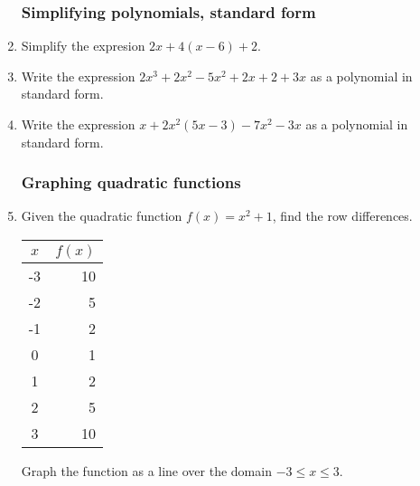 \documentclass[12pt, oneside]{article}
\begin{document}
\begin{enumerate}
\newpage
\subsubsection*{Simplifying polynomials, standard form}

\item Simplify the expresion $2x + 4(x-6)+2$.\vspace{4cm}
\item Write the expression $2x^3+2x^2-5x^2+2x+2+3x$ as a polynomial in standard form. \vspace{7cm}

  \item Write the expression $x+2x^2(5x-3)-7x^2-3x$ as a polynomial in standard form.

\newpage


\subsubsection*{Graphing quadratic functions}

\item Given the quadratic function $f(x)=x^2+1$, find the row differences.
  \renewcommand{\arraystretch}{1.6}
    \begin{center}
      \begin{tabular}{|c|r|}
      \hline
      $x$ & $f(x)$\\
      \hline
      -3 & 10 \\
      \hline
      -2 & 5 \\
      \hline
      -1 & 2 \\
      \hline
      0 & 1 \\
      \hline
      1 & 2 \\
      \hline
      2 & 5 \\
      \hline
      3 & 10 \\
      \hline
      \end{tabular}
    \end{center}
Graph the function as a line over the domain $-3 \leq x \leq 3$.

\begin{center} %
\end{center}


\end{enumerate}
\end{document}
